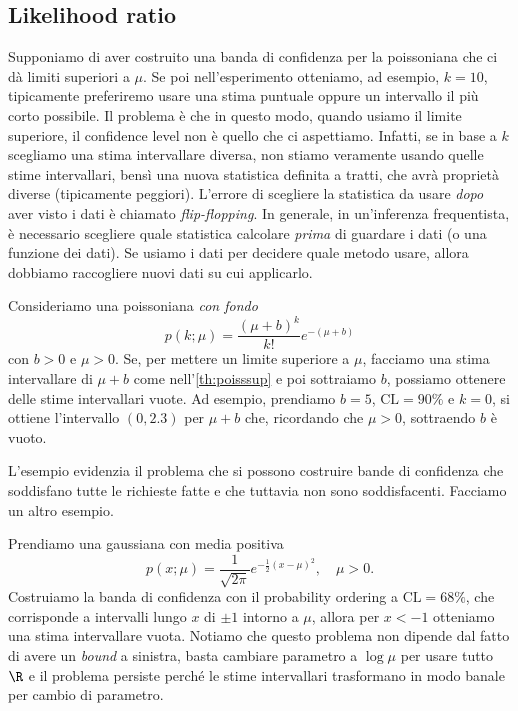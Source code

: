 
\subsection{Likelihood ratio}

Supponiamo di aver costruito una banda di confidenza per la poissoniana che ci dà limiti superiori a $\mu$.
Se poi nell'esperimento otteniamo, ad esempio, $k=10$,
tipicamente preferiremo usare una stima puntuale oppure un intervallo il più corto possibile.
Il problema è che in questo modo, quando usiamo il limite superiore,
il confidence level non è quello che ci aspettiamo.
Infatti, se in base a $k$ scegliamo una stima intervallare diversa,
non stiamo veramente usando quelle stime intervallari,
bensì una nuova statistica definita a tratti,
che avrà proprietà diverse (tipicamente peggiori).
L'errore di scegliere la statistica da usare \emph{dopo}
aver visto i dati è chiamato \emph{flip-flopping}.
In generale, in un'inferenza frequentista,
è necessario scegliere quale statistica calcolare \emph{prima}
di guardare i dati (o una funzione dei dati).
Se usiamo i dati per decidere quale metodo usare,
allora dobbiamo raccogliere nuovi dati su cui applicarlo.

\begin{example}
	Consideriamo una poissoniana \emph{con fondo}
	\begin{equation*}
		p(k;\mu)
		= \frac{(\mu+b)^k}{k!}e^{-(\mu+b)}
	\end{equation*}
	con $b>0$ e $\mu>0$.
	Se, per mettere un limite superiore a $\mu$,
	facciamo una stima intervallare di $\mu+b$ come nell'\autoref{th:poisssup} e poi sottraiamo $b$,
	possiamo ottenere delle stime intervallari vuote.
	Ad esempio, prendiamo $b=5$, $\mathrm{CL}=\SI{90}\%$ e $k=0$,
	si ottiene l'intervallo $(0,2.3)$ per $\mu+b$ che,
	ricordando che $\mu>0$, sottraendo $b$ è vuoto.
\end{example}

L'esempio evidenzia il problema che si possono costruire bande di confidenza
che soddisfano tutte le richieste fatte e che tuttavia non sono soddisfacenti.
Facciamo un altro esempio.

\begin{example}
	Prendiamo una gaussiana con media positiva
	\begin{equation*}
		p(x;\mu)
		= \frac1{\sqrt{2\pi}} e^{-\frac12(x-\mu)^2}, \quad \mu>0.
	\end{equation*}
	Costruiamo la banda di confidenza con il probability ordering a $\mathrm{CL}=\SI{68}\%$,
	che corrisponde a intervalli lungo $x$ di $\pm1$ intorno a $\mu$,
	allora per $x<-1$ otteniamo una stima intervallare vuota.
	Notiamo che questo problema non dipende dal fatto di avere un \emph{bound} a sinistra,
	basta cambiare parametro a $\log\mu$ per usare tutto $\R$ e il problema persiste perché
	le stime intervallari trasformano in modo banale per cambio di parametro.
\end{example}

